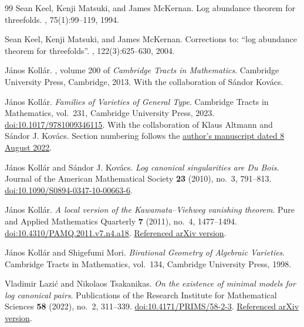 \begin{thebibliography}{99}
Sean Keel, Kenji Matsuki, and James McKernan.
\newblock Log abundance theorem for threefolds.
, 75(1):99--119, 1994.

Sean Keel, Kenji Matsuki, and James McKernan.
\newblock Corrections to: ``log abundance theorem for threefolds''.
, 122(3):625--630, 2004.

J{\'a}nos Koll{\'a}r.
, volume 200 of {\em Cambridge Tracts in Mathematics}.
\newblock Cambridge University Press, Cambridge, 2013.
\newblock With the collaboration of S{\'a}ndor Kov{\'a}cs.

J{\'a}nos Koll{\'a}r.
\newblock \emph{Families of Varieties of General Type}.
\newblock Cambridge Tracts in Mathematics, vol.~231, Cambridge University Press, 2023.
\newblock \href{https://doi.org/10.1017/9781009346115}{doi:10.1017/9781009346115}.
\newblock With the collaboration of Klaus Altmann and S{\'a}ndor J. Kov{\'a}cs. Section numbering follows the \href{https://web.math.princeton.edu/~kollar/FromMyHomePage/modbook-final.pdf}{author's manuscript dated 8 August 2022}.

J{\'a}nos Koll{\'a}r and S{\'a}ndor J. Kov{\'a}cs.
\newblock \emph{Log canonical singularities are {Du Bois}}.
\newblock Journal of the American Mathematical Society \textbf{23} (2010), no.~3, 791--813.
\newblock \href{https://doi.org/10.1090/S0894-0347-10-00663-6}{doi:10.1090/S0894-0347-10-00663-6}.

J{\'a}nos Koll{\'a}r.
\newblock \emph{A local version of the {Kawamata--Viehweg} vanishing theorem}.
\newblock Pure and Applied Mathematics Quarterly \textbf{7} (2011), no.~4, 1477--1494.
\newblock \href{https://doi.org/10.4310/PAMQ.2011.v7.n4.a18}{doi:10.4310/PAMQ.2011.v7.n4.a18}.
\newblock \href{https://arxiv.org/abs/1005.4843}{Referenced arXiv version}.

J{\'a}nos Koll{\'a}r and Shigefumi Mori.
\newblock \emph{Birational Geometry of Algebraic Varieties}.
\newblock Cambridge Tracts in Mathematics, vol.~134, Cambridge University Press, 1998.

Vladimir Lazi{\'c} and Nikolaos Tsakanikas.
\newblock \emph{On the existence of minimal models for log canonical pairs}.
\newblock Publications of the Research Institute for Mathematical Sciences \textbf{58} (2022), no.~2, 311--339.
\newblock \href{https://doi.org/10.4171/PRIMS/58-2-3}{doi:10.4171/PRIMS/58-2-3}.
\newblock \href{https://arxiv.org/abs/1905.05576v3}{Referenced arXiv version}.


\end{thebibliography}
